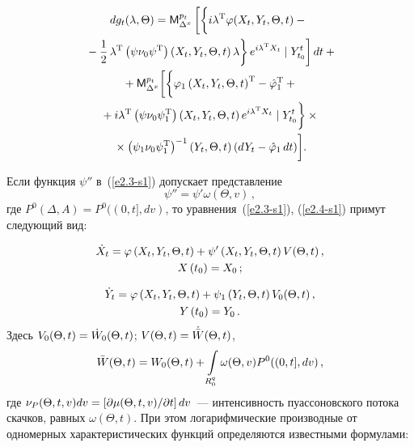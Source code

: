 \begin{multicols}{2}
\noindent
\begin{multline}
dg_t (\la,\Theta) = {\mm}_{\Delta^x}^{p_t} \left[
\left\{ \vphantom{\fr{1}{2}}
i\la^{\mathrm{T}} \varphi (X_t,Y_t,\Theta, t) -{}\right.\right.\\
\left.\left.{}- \fr{1}{2}\, \la^{\mathrm{T}} 
\left(\psi\nu_0\psi^{\mathrm{T}}\right) 
\left(X_t,Y_t,\Theta, t\right) \la\right\} 
e^{i\la^{\mathrm{T}} X_t} \mid Y_{t_0}^t\right] dt+{}\\
{}+ {\mm}_{\Delta^x}^{p_t} \biggl[ 
\biggl\{ 
\varphi_1 \left(X_t,Y_t,\Theta, t\right)^{\mathrm{T}} -
\hat\varphi_1^{\mathrm{T}} +{}\\
{}+
    i\la^{\mathrm{T}} \left(\psi\nu_0\psi_1^{\mathrm{T}}\right) 
    \left(X_t,Y_t, \Theta,t\right) e^{i\la^{\mathrm{T}} X_t} \mid Y_{t_0}^t
   \biggr\} \times{}\\
   {}\times\left(\psi_1\nu_0\psi_1^{\mathrm{T}}\right)^{-1} \left(Y_t,\Theta,t\right) 
   \left(dY_t-\hat\varphi_1\, dt\right)
    \biggr]. \label{e2.11-s1}
    \end{multline}

Если функция $\psi''$ в~(\ref{e2.3-s1}) допускает представление~\cite{8-s1, 9-s1}
\begin{equation}
\psi'' = \psi' \omega (\Theta, v)\,,\label{e2.12-s1}
\end{equation}
где  $P^0 (\Delta, A) = P^0 ((0,t], dv)$, то уравнения~(\ref{e2.3-s1}), 
(\ref{e2.4-s1}) примут следующий вид:

\noindent
\begin{multline}
\dot X_t =\varphi \left(X_t, Y_t, \Theta, t\right)+\psi' 
\left(X_t, Y_t, \Theta, t\right)V(\Theta, t)\,,\\
 X\left(t_0\right)=X_0\,;
\label{e2.13-s1}
\end{multline}

\vspace*{-12pt}

\noindent
\begin{multline}
\dot Y_t = \varphi\left(X_t, Y_t, \Theta, t\right)+\psi_1 
\left(Y_t, \Theta, t\right) V_0 (\Theta, t)\,,\\
 Y\left(t_0\right) = Y_0\,.
\label{e2.14-s1}
\end{multline}
Здесь
$V_0 (\Theta, t)\hm =\dot W_0 (\Theta, t)$; $V (\Theta, t)\hm=\dot{\bar W}  (\Theta, t)$,
\begin{equation*}
\bar W (\Theta, t) = W_0  (\Theta, t)+ \int\limits_{R_0^q} \omega (\Theta, v) 
P^0 ((0,t],dv)\,,
\end{equation*}
где $\nu_P  (\Theta, t,v) dv\hm= \lk \prt \mu  (\Theta, t,v)/\prt t\rk dv$~--- 
интенсивность пуассоновского потока скачков, равных $\omega (\Theta, t)$.
%
При этом логарифмические производные от одномерных характеристических функций 
определяются известными формулами:


\end{multicols}
